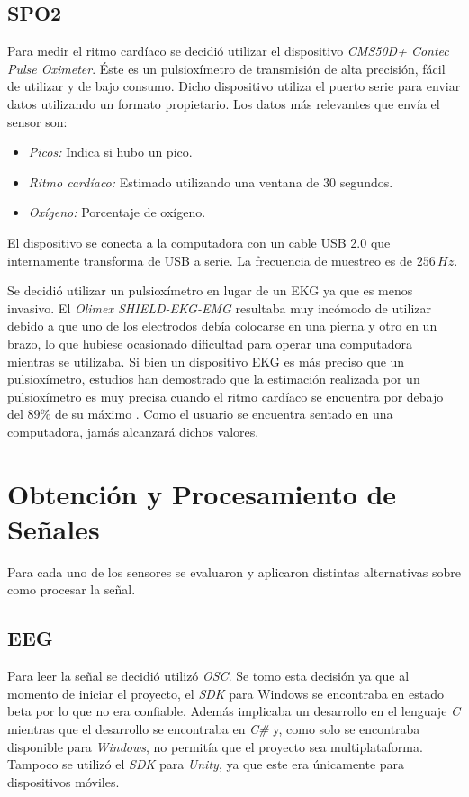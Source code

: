 \subsection{SPO2}

Para medir el ritmo cardíaco se decidió utilizar el dispositivo \emph{CMS50D+ Contec Pulse Oximeter}. Éste es un pulsioxímetro de transmisión de alta precisión, fácil de utilizar y de bajo consumo. Dicho dispositivo utiliza el puerto serie para enviar datos utilizando un formato propietario. Los datos más relevantes que envía el sensor son:

\begin{itemize}
\item \emph{Picos:}  Indica si hubo un pico.
\item \emph{Ritmo cardíaco:} Estimado utilizando una ventana de 30 segundos.
\item \emph{Oxígeno:} Porcentaje de oxígeno.
\end{itemize} 

El dispositivo se conecta a la computadora con un cable USB 2.0 que internamente transforma de USB a serie. La frecuencia de muestreo es de $256 \, Hz$.

Se decidió utilizar un pulsioxímetro en lugar de un EKG ya que es menos invasivo. El \emph{Olimex SHIELD-EKG-EMG} resultaba muy incómodo de utilizar debido a que uno de los electrodos debía colocarse en una pierna y otro en un brazo, lo que hubiese ocasionado dificultad para operar una computadora mientras se utilizaba. Si bien un dispositivo EKG es más preciso que un pulsioxímetro, estudios han demostrado que la estimación realizada por un pulsioxímetro es muy precisa cuando el ritmo cardíaco se encuentra por debajo del $89\% $ de su máximo \cite{spo2-accuracy}. Como el usuario se encuentra sentado en una computadora, jamás alcanzará dichos valores.

\section{Obtención y Procesamiento de Señales}

Para cada uno de los sensores se evaluaron y aplicaron distintas alternativas sobre como procesar la señal.

\subsection{EEG}

Para leer la señal se decidió utilizó \emph{OSC}. Se tomo esta decisión ya que al momento de iniciar el proyecto, el \emph{SDK} para Windows se encontraba en estado beta por lo que no era confiable. Además implicaba un desarrollo en el lenguaje \emph{C} mientras que el desarrollo se encontraba en \emph{C\#} y, como solo se encontraba disponible para \emph{Windows}, no permitía que el proyecto sea multiplataforma. Tampoco se utilizó el \emph{SDK} para \emph{Unity}, ya que este era únicamente para dispositivos móviles.

